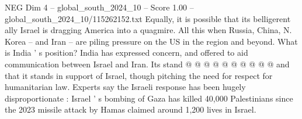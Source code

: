 \begin{textsample}{NEG Dim 4 – global\_south\_2024\_10 – Score 1.00 – global\_south\_2024\_10/115262152.txt}
Equally, it is possible that its belligerent ally Israel is dragging America into a quagmire.
All this when Russia, China, N.
Korea -- and Iran -- are piling pressure on the US in the region and beyond.
What is India ' s position?
India has expressed concern, and offered to aid communication between Israel and Iran.
Its stand @ @ @ @ @ @ @ @ @ @ and that it stands in support of Israel, though pitching the need for respect for humanitarian law.
Experts say the Israeli response has been hugely disproportionate : Israel ' s bombing of Gaza has killed 40,000 Palestinians since the 2023 missile attack by Hamas claimed around 1,200 lives in Israel.

\end{textsample}
